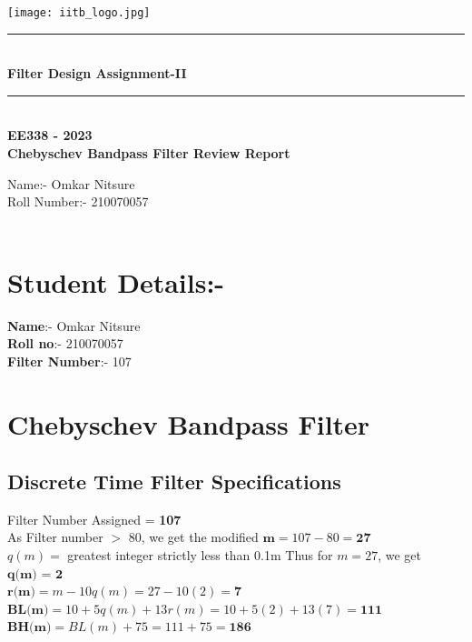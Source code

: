 \documentclass[12pt]{article}
\begin{document}
\begin{titlepage}
\begin{center}
    \vspace*{\fill}
\texttt{[image: iitb\_logo.jpg]}\\
[4 cm]
    \rule{12.5cm}{0.75mm}\\
    \huge{\bfseries Filter Design Assignment-II}
    \rule{12.5cm}{0.75mm}\\
    [0.5cm]
   {\textbf {EE338 - 2023 \\
    Chebyschev Bandpass Filter Review Report}}\\
    [2cm]
\end{center}
\begin{flushleft}
   {\huge
    Name:- Omkar Nitsure \\
    Roll Number:- 210070057 \\
     \\}
    \end{flushleft}
\end{titlepage}
\tableofcontents

\pagestyle{fancy}

\fancyhead{}
\fancyfoot{}
\fancyfoot[C]{\thepage}
\newpage
\section{Student Details:-}
\textbf{Name}:- Omkar Nitsure\\
\textbf{Roll no}:- 210070057\\
\textbf{Filter Number}:- 107\\

\section{Chebyschev Bandpass Filter}
\subsection{Discrete Time Filter Specifications}

Filter Number Assigned = \textbf{107}\\
As Filter number $>$ 80, we get the modified $\textbf{m} = 107 - 80 = \textbf{27}$\\
$q(m) =$ greatest integer strictly less than 0.1m
Thus for $m = 27$, we get $\textbf{q(m) = 2}$\\
$\textbf{r(m)} = m - 10q(m) = 27 - 10(2) = \textbf{7}$\\
$\textbf{BL(m)} = 10 + 5q(m) + 13r(m) = 10 + 5(2) + 13(7) = \textbf{111}$\\
$\textbf{BH(m)} = BL(m) + 75 = 111 + 75 = \textbf{186}$\\
\par
\end{document}
